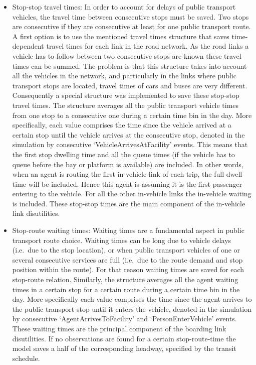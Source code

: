 \begin{itemize}

\item Stop-stop travel times: In order to account for delays of public transport vehicles, the travel time between consecutive stops must be saved. Two stops are consecutive if they are consecutive at least for one public transport route. A first option is to use the mentioned travel times structure that saves time-dependent travel times for each link in the road network. As the road links a vehicle has to follow between two consecutive stops are known these travel times can be summed. The problem is that this structure takes into account all the vehicles in the network, and particularly in the links where public transport stops are located, travel times of cars and buses are very different. Consequently a special structure was implemented to save these stop-stop travel times. The structure averages all the public transport vehicle times from one stop to a consecutive one during a certain time bin in the day. More specifically, each value comprises the time since the vehicle arrived at a certain stop until the vehicle arrives at the consecutive stop, denoted in the simulation by consecutive `VehicleArrivesAtFacility' events. This means that the first stop dwelling time and all the queue times (if the vehicle has to queue before the bay or platform is available) are included. In other words, when an agent is routing the first in-vehicle link of each trip, the full dwell time will be included. Hence this agent is assuming it is the first passenger entering to the vehicle. For all the other in-vehicle links the in-vehicle waiting is included. These stop-stop times are the main component of the in-vehicle link disutilities.

\item Stop-route waiting times: Waiting times are a fundamental aspect in public transport route choice. Waiting times can be long due to vehicle delays (i.e.\ due to the stop location), or when public transport vehicles of one or several consecutive services are full (i.e.\ due to the route demand and stop position within the route). For that reason waiting times are saved for each stop-route relation. Similarly, the structure averages all the agent waiting times in a certain stop for a certain route during a certain time bin in the day. More specifically each value comprises the time since the agent arrives to the public transport stop until it enters the vehicle, denoted in the simulation by consecutive `AgentArrivesToFacility' and `PersonEnterVehicle' events. These waiting times are the principal component of the boarding link disutilities. If no observations are found for a certain stop-route-time the model saves a half of the corresponding headway, specified by the transit schedule.


\end{itemize}
